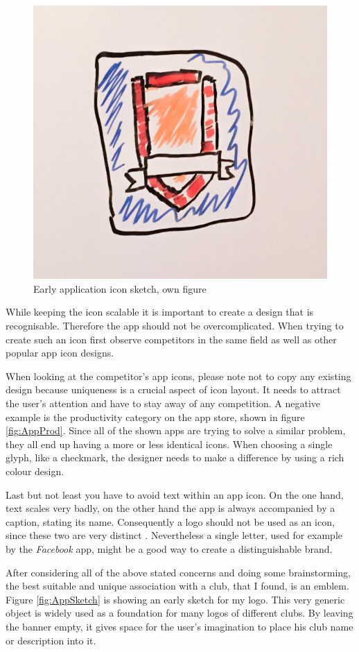 \begin{figure}[h]
  	\centering
  	\includegraphics[width=0.5\linewidth]{./images/app-sketch.jpg}
  	\caption{Early application icon sketch, own figure}
	\label{fig:AppSketch}
\end{figure}

While keeping the icon scalable it is important to create a design that is recognisable. Therefore the app should not be overcomplicated. When trying to create such an icon first observe competitors in the same field as well as other popular app icon designs. \cite{Flarup:2015aa}

When looking at the competitor's app icons, please note not to copy any existing design because uniqueness is a crucial aspect of icon layout. It needs to attract the user's attention and have to stay away of any competition. A negative example is the productivity category on the app store, shown in figure \vref{fig:AppProd}. Since all of the shown apps are trying to solve a similar problem, they all end up having a more or less identical icons. When choosing a single glyph, like a checkmark, the designer needs to make a difference by using a rich colour design. \cite{Flarup:2015aa}

Last but not least you have to avoid text within an app icon. On the one hand, text scales very badly, on the other hand the app is always accompanied by a caption, stating its name. Consequently a logo should not be used as an icon, since these two are very distinct \cite{Flarup:2015ab}. Nevertheless a single letter, used for example by the \emph{Facebook} app, might be a good way to create a distinguishable brand.

After considering all of the above stated concerns and doing some brainstorming, the best suitable and unique association with a club, that I found, is an emblem. Figure \vref{fig:AppSketch} is showing an early sketch for my logo. This very generic object is widely used as a foundation for many logos of different clubs. By leaving the banner empty, it gives space for the user's imagination to place his club name or description into it. 

